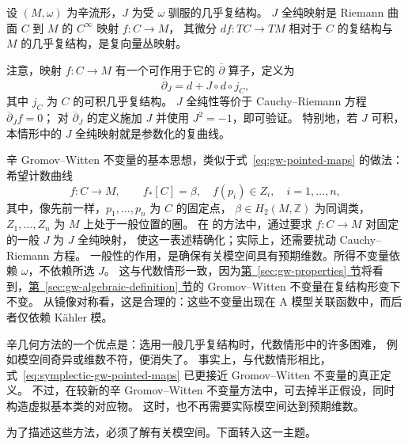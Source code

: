 \begin{definition}\label{def:j-holomorphic-map}
设 $(M,\omega)$ 为辛流形，$J$ 为受 $\omega$ 驯服的几乎复结构。
$J$ 全纯映射是 Riemann 曲面 $C$ 到 $M$ 的 $C^\infty$ 映射 $f:C\to M$，
其微分 $df:TC\to TM$ 相对于 $C$ 的复结构与 $M$ 的几乎复结构，是复向量丛映射。
\end{definition}
注意，映射 $f:C\to M$ 有一个可作用于它的 $\overline\partial$ 算子，定义为
\begin{equation}\label{eq:symplectic-cauchy-riemann-operator}
\overline\partial_J=d+J\circ d\circ j_C,
\end{equation}
其中 $j_C$ 为 $C$ 的可积几乎复结构。
$J$ 全纯性等价于 Cauchy--Riemann 方程 $\overline\partial_Jf=0$；
对 $\overline\partial_J$ 的定义施加 $J$ 并使用 $J^2=-1$，即可验证。
特别地，若 $J$ 可积，本情形中的 $J$ 全纯映射就是参数化的复曲线。

辛 Gromov--Witten 不变量的基本思想，类似于式~\eqref{eq:gw-pointed-maps} 的做法：
希望计数曲线
\begin{equation}\label{eq:symplectic-gw-pointed-maps}
f:C\to M,\qquad f_*[C]=\beta,\quad f(p_i)\in Z_i,\quad i=1,\ldots,n,
\end{equation}
其中，像先前一样，$p_1,\ldots,p_n$ 为 $C$ 的固定点，
$\beta\in H_2(M,\mathbb Z)$ 为同调类，$Z_1,\ldots,Z_n$ 为 $M$ 上处于一般位置的圈。
在  的方法中，通过要求 $f:C\to M$ 对固定的一般 $J$ 为 $J$ 全纯映射，
使这一表述精确化；实际上，还需要扰动 Cauchy--Riemann 方程。
一般性的作用，是确保有关模空间具有预期维数。所得不变量依赖 $\omega$，不依赖所选 $J$。
这与代数情形一致，因为\hyperref[sec:gw-properties]{第~\ref*{sec:gw-properties} 节}将看到，\hyperref[sec:gw-algebraic-definition]{第~\ref*{sec:gw-algebraic-definition} 节}的 Gromov--Witten 不变量在复结构形变下不变。
从镜像对称看，这是合理的：这些不变量出现在 A 模型关联函数中，而后者仅依赖 Kähler 模。

辛几何方法的一个优点是：选用一般几乎复结构时，代数情形中的许多困难，
例如模空间奇异或维数不符，便消失了。
事实上，与代数情形相比，式~\eqref{eq:symplectic-gw-pointed-maps} 已更接近 Gromov--Witten 不变量的真正定义。
不过，在较新的辛 Gromov--Witten 不变量方法中，可去掉半正假设，同时构造虚拟基本类的对应物。
这时，也不再需要实际模空间达到预期维数。

为了描述这些方法，必须了解有关模空间。下面转入这一主题。

